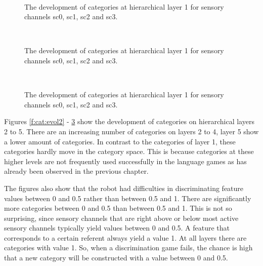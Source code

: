 \begin{figure}
\centering
{}
\\
\caption{The development of categories at hierarchical layer 1 for sensory channels sc0, sc1, sc2 and sc3.}
\label{f:cat:evol3}
\end{figure}

\begin{figure}
\centering
{}
\\
\caption{The development of categories at hierarchical layer 1 for sensory channels sc0, sc1, sc2 and sc3.}
\label{f:cat:evol4}
\end{figure}

\begin{figure}
\centering
{}
\\
\caption{The development of categories at hierarchical layer 1 for sensory channels sc0, sc1, sc2 and sc3.}
\label{f:cat:evol5}
\end{figure}


\p
Figures \ref{f:cat:evol2} - \ref{f:cat:evol5} show the development of categories on hierarchical layers 2 to 5. There are an increasing number of categories on layers 2 to 4, layer 5 show a lower amount of categories. In contrast to the categories of layer 1, these categories hardly move in the category space. This is because categories at these higher levels are not frequently used successfully in the language games as has already been observed in the previous chapter.

The figures also show that the robot had difficulties in discriminating feature values between 0 and 0.5 rather than between 0.5 and 1. There are significantly more categories between 0 and 0.5 than between 0.5 and 1. This is not so surprising, since sensory channels that are right above or below most active sensory channels typically yield values between 0 and 0.5. A feature that corresponds to a certain referent always yield a value 1. At all layers there are categories with value 1. So, when a discrimination game fails, the chance is high that a new category will be constructed with a value between 0 and 0.5.

